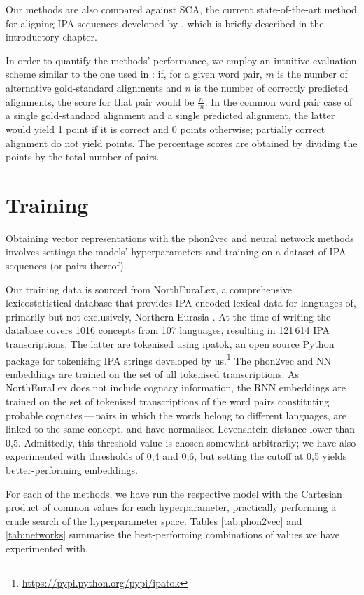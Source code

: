 \documentclass[a4paper]{report}
\begin{document}
Our methods are also compared against SCA, the current state-of-the-art method for aligning IPA sequences developed by \citet{2012_List},
which is briefly described in the introductory chapter.

In order to quantify the methods' performance, we employ an intuitive evaluation scheme similar to the one used in \citet{2002_Kondrak_Hirst}:
if, for a given word pair, $m$ is the number of alternative gold-standard alignments
and $n$ is the number of correctly predicted alignments, the score for that pair would be $\frac{n}{m}$.
In the common word pair case of a single gold-standard alignment and a single predicted alignment,
the latter would yield 1 point if it is correct and 0 points otherwise;
partially correct alignment do not yield points.
The percentage scores are obtained by dividing the points by the total number of pairs.


\section{Training}

Obtaining vector representations with the phon2vec and neural network methods involves
settings the models' hyperparameters and training on a dataset of IPA sequences (or pairs thereof).

Our training data is sourced from NorthEuraLex, a comprehensive lexicostatistical database
that provides IPA-encoded lexical data for languages of, primarily but not exclusively, Northern Eurasia \citep{2017_Dellert_Jäger}.
At the time of writing the database covers 1016 concepts from 107 languages, resulting in 121\,614 IPA transcriptions.
The latter are tokenised using ipatok, an open source Python package for tokenising IPA strings developed by us.\footnote{\url{https://pypi.python.org/pypi/ipatok}}
The phon2vec and NN embeddings are trained on the set of all tokenised transcriptions.
As NorthEuraLex does not include cognacy information,
the RNN embeddings are trained on the set of tokenised transcriptions of the word pairs constituting probable cognates\,---\,pairs
in which the words belong to different languages, are linked to the same concept, and have normalised Levenshtein distance lower than 0,5.
Admittedly, this threshold value is chosen somewhat arbitrarily;
we have also experimented with thresholds of 0,4 and 0,6, but setting the cutoff at 0,5 yields better-performing embeddings.

For each of the methods, we have run the respective model with the Cartesian product of common values for each hyperparameter,
practically performing a crude search of the hyperparameter space.
Tables \ref{tab:phon2vec} and \ref{tab:networks} summarise the best-performing combinations of values we have experimented with.
\end{document}
